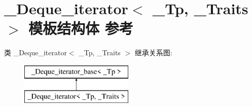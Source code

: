 \hypertarget{struct___deque__iterator}{}\section{\+\_\+\+Deque\+\_\+iterator$<$ \+\_\+\+Tp, \+\_\+\+Traits $>$ 模板结构体 参考}
\label{struct___deque__iterator}
类 \+\_\+\+Deque\+\_\+iterator$<$ \+\_\+\+Tp, \+\_\+\+Traits $>$ 继承关系图\+:\begin{figure}[H]
\begin{center}
\leavevmode
\includegraphics[height=2.000000cm]{struct___deque__iterator}
\end{center}
\end{figure}
